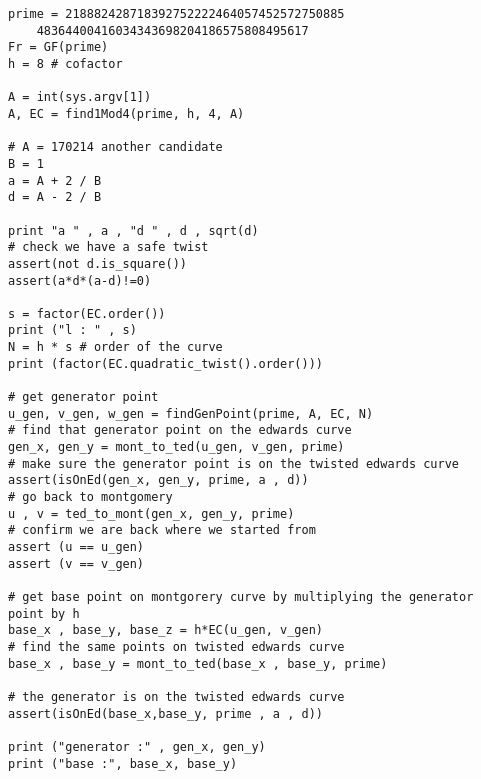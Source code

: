 \begin{lstlisting}
prime = 218882428718392752222464057452572750885
	48364400416034343698204186575808495617
Fr = GF(prime)
h = 8 # cofactor

A = int(sys.argv[1])
A, EC = find1Mod4(prime, h, 4, A)

# A = 170214 another candidate
B = 1
a = A + 2 / B
d = A - 2 / B

print "a " , a , "d " , d , sqrt(d)
# check we have a safe twist
assert(not d.is_square())
assert(a*d*(a-d)!=0)

s = factor(EC.order())
print ("l : " , s)
N = h * s # order of the curve
print (factor(EC.quadratic_twist().order()))

# get generator point
u_gen, v_gen, w_gen = findGenPoint(prime, A, EC, N)
# find that generator point on the edwards curve
gen_x, gen_y = mont_to_ted(u_gen, v_gen, prime)
# make sure the generator point is on the twisted edwards curve
assert(isOnEd(gen_x, gen_y, prime, a , d))
# go back to montgomery
u , v = ted_to_mont(gen_x, gen_y, prime)
# confirm we are back where we started from
assert (u == u_gen)
assert (v == v_gen)

# get base point on montgorery curve by multiplying the generator point by h
base_x , base_y, base_z = h*EC(u_gen, v_gen)
# find the same points on twisted edwards curve
base_x , base_y = mont_to_ted(base_x , base_y, prime)

# the generator is on the twisted edwards curve
assert(isOnEd(base_x,base_y, prime , a , d))

print ("generator :" , gen_x, gen_y)
print ("base :", base_x, base_y)
\end{lstlisting}